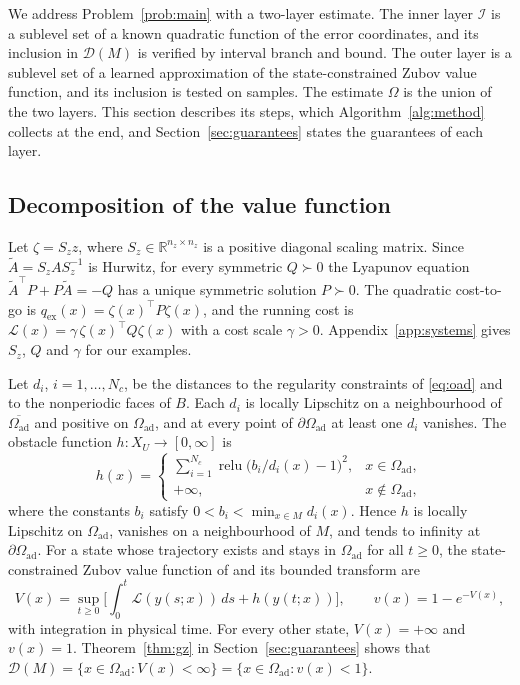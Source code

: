 \documentclass{l4dc2027}
\newcommand{\Oad}{\Omega_{\mathrm{ad}}}
\newcommand{\R}{\mathbb{R}}
\newcommand{\D}{\mathcal D}
\newcommand{\I}{\mathcal I}
\newcommand{\qex}{q_{\mathrm{ex}}}
\newcommand{\relu}{\operatorname{relu}}
\begin{document}
We address Problem~\ref{prob:main} with a two-layer estimate. The inner layer $\I$ is a sublevel set of a known quadratic function of the error coordinates, and its inclusion in $\D(M)$ is verified by interval branch and bound. The outer layer is a sublevel set of a learned approximation of the state-constrained Zubov value function, and its inclusion is tested on samples. The estimate $\Omega$ is the union of the two layers. This section describes its steps, which Algorithm~\ref{alg:method} collects at the end, and Section~\ref{sec:guarantees} states the guarantees of each layer.

\vspace{-0.15in}

\subsection{Decomposition of the value function}
Let $\zeta=S_zz$, where $S_z\in\R^{n_z\times n_z}$ is a positive diagonal scaling matrix. Since $\tilde A=S_zAS_z^{-1}$ is Hurwitz, for every symmetric $Q\succ0$ the Lyapunov equation $\tilde A^\top P+P\tilde A=-Q$ has a unique symmetric solution $P\succ0$. The quadratic cost-to-go is $\qex(x)=\zeta(x)^\top P\zeta(x)$, and the running cost is $\mathcal L(x)=\gamma\,\zeta(x)^\top Q\zeta(x)$ with a cost scale $\gamma>0$. Appendix~\ref{app:systems} gives $S_z$, $Q$ and $\gamma$ for our examples.

Let $d_i$, $i=1,\dots,N_c$, be the distances to the regularity constraints of \eqref{eq:oad} and to the nonperiodic faces of $B$. Each $d_i$ is locally Lipschitz on a neighbourhood of $\overline{\Oad}$ and positive on $\Oad$, and at every point of $\partial\Oad$ at least one $d_i$ vanishes. The obstacle function $h:X_U\to[0,\infty]$ is
\begin{equation}\label{eq:h}
h(x)=\begin{cases}\displaystyle\sum_{i=1}^{N_c}\relu\big(b_i/d_i(x)-1\big)^2, & x\in\Oad,\\ +\infty, & x\notin\Oad,\end{cases}
\end{equation}
where the constants $b_i$ satisfy $0<b_i<\min_{x\in M}d_i(x)$. Hence $h$ is locally Lipschitz on $\Oad$, vanishes on a neighbourhood of $M$, and tends to infinity at $\partial\Oad$. For a state whose trajectory exists and stays in $\Oad$ for all $t\ge0$, the state-constrained Zubov value function of \citet{gruene2015} and its bounded transform are
\begin{equation}\label{eq:V}
V(x)=\sup_{t\ge0}\Big[\int_0^t\mathcal L(y(s;x))\,ds+h(y(t;x))\Big],\qquad v(x)=1-e^{-V(x)},
\end{equation}
with integration in physical time. For every other state, $V(x)=+\infty$ and $v(x)=1$. Theorem~\ref{thm:gz} in Section~\ref{sec:guarantees} shows that $\D(M)=\{x\in\Oad:V(x)<\infty\}=\{x\in\Oad:v(x)<1\}$.
\end{document}
